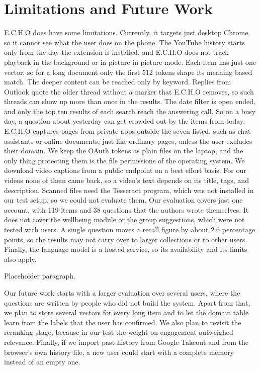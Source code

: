 \documentclass[conference]{IEEEtran}
\begin{document}
\section{Limitations and Future Work}\label{sec:limits}
E.C.H.O does have some limitations. Currently, it targets just desktop Chrome, so it cannot see what the user does on the phone. The YouTube history starts only from the day the extension is installed, and E.C.H.O does not track playback in the background or in picture in picture mode. Each item has just one vector, so for a long document only the first 512 tokens shape its meaning based match. The deeper content can be reached only by keyword. Replies from Outlook quote the older thread without a marker that E.C.H.O removes, so such threads can show up more than once in the results. The date filter is open ended, and only the top ten results of each search reach the answering call. So on a busy day, a question about yesterday can get crowded out by the items from today. E.C.H.O captures pages from private apps outside the seven listed, such as chat assistants or online documents, just like ordinary pages, unless the user excludes their domain. We keep the OAuth tokens as plain files on the laptop, and the only thing protecting them is the file permissions of the operating system. We download video captions from a public endpoint on a best effort basis. For our videos none of them came back, so a video's text depends on its title, tags, and description. Scanned files need the Tesseract program, which was not installed in our test setup, so we could not evaluate them. Our evaluation covers just one account, with 119 items and 38 questions that the authors wrote themselves. It does not cover the wellbeing module or the group suggestions, which were not tested with users. A single question moves a recall figure by about 2.6 percentage points, so the results may not carry over to larger collections or to other users. Finally, the language model is a hosted service, so its availability and its limits also apply.

Placeholder paragraph.

Our future work starts with a larger evaluation over several users, where the questions are written by people who did not build the system. Apart from that, we plan to store several vectors for every long item and to let the domain table learn from the labels that the user has confirmed. We also plan to revisit the reranking stage, because in our test the weight on engagement outweighed relevance. Finally, if we import past history from Google Takeout and from the browser's own history file, a new user could start with a complete memory instead of an empty one.
\end{document}
